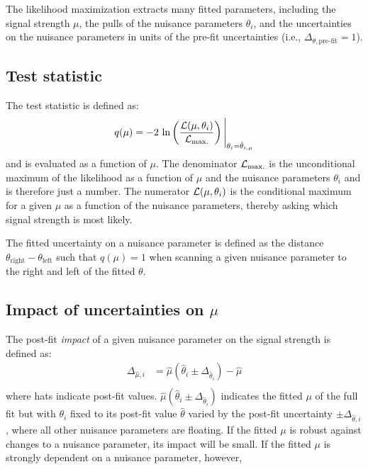 The likelihood maximization extracts many fitted parameters, including the signal strength $\mu$, the pulls of the nuisance parameters $\theta_i$, and the uncertainties on the nuisance parameters in units of the pre-fit uncertainties (i.e., $\Delta_{\theta,\text{pre-fit}} = 1$).

\subsection{Test statistic}

The test statistic is defined as:
%
\begin{equation}
  \begin{split}
    q(\mu) &= -2\ \text{ln} \left(\frac{\Lang(\mu, \theta_i)}{\Lang_\text{max.}}\right) \Bigg\rvert_{\theta_i = \hat{\theta}_{i,\mu}} \\
  \end{split}
  \label{eqn:test-statistic}
\end{equation}
%
and is evaluated as a function of $\mu$. The denominator $\mathcal{L}_\text{max.}$ is the unconditional maximum of the likelihood as a function of $\mu$ and the nuisance parameters $\theta_i$ and is therefore just a number. The numerator $\mathcal{L}(\mu, \theta_i)$ is the conditional maximum for a given $\mu$ as a function of the nuisance parameters, thereby asking which signal strength is most likely.

The fitted uncertainty on a nuisance parameter is defined as the distance $\theta_\text{right} - \theta_\text{left}$ such that $q(\mu) = 1$ when scanning a given nuisance parameter to the right and left of the fitted $\theta$.

\subsection{Impact of uncertainties on $\mu$}

The post-fit \textit{impact} of a given nuisance parameter on the signal strength is defined as:
%
\begin{equation}
  \begin{split}
    \Delta_{\hat{\mu}, i} &= \hat{\mu}\left(\hat{\theta}_i \pm \Delta_{\hat{\theta}_i}\right) - \hat{\mu} \\
  \end{split}
  \label{eqn:impact}
\end{equation}
%
where hats indicate post-fit values. $\hat{\mu}\left(\hat{\theta}_i \pm \Delta_{\hat{\theta}_i}\right)$ indicates the fitted $\mu$ of the full fit but with $\theta_i$ fixed to its post-fit value $\hat{\theta}$ varied by the post-fit uncertainty $\pm\Delta_{\hat{\theta}, i}$, where all other nuisance parameters are floating. If the fitted $\mu$ is robust against changes to a nuisance parameter, its impact will be small. If the fitted $\mu$ is strongly dependent on a nuisance parameter, however, 

